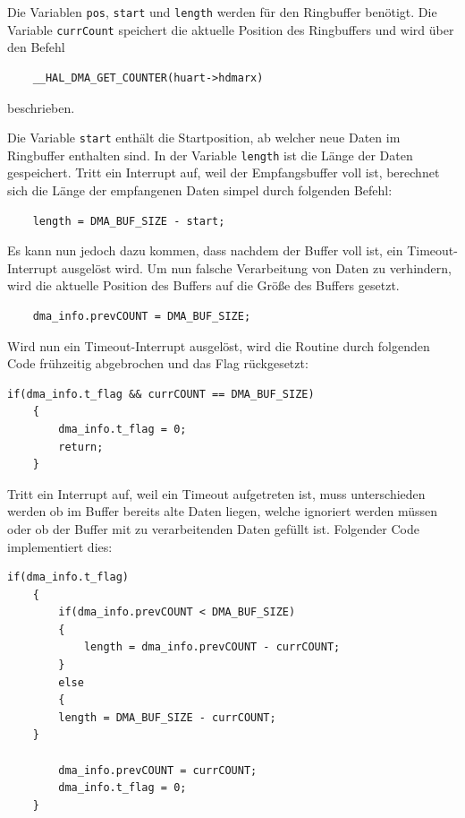   \smallskip

  Die Variablen \lstinline!pos!, \lstinline!start! und \lstinline!length! werden für den Ringbuffer benötigt. Die Variable \lstinline!currCount! speichert die aktuelle Position des
  Ringbuffers und wird über den Befehl
  
  \begin{lstlisting}
    __HAL_DMA_GET_COUNTER(huart->hdmarx)
  \end{lstlisting}
  beschrieben.

  \newpage

  Die Variable \lstinline!start! enthält die Startposition, ab welcher neue Daten im Ringbuffer enthalten sind. In der Variable \lstinline!length!
  ist die Länge der Daten gespeichert. Tritt ein Interrupt auf, weil der Empfangsbuffer voll ist, berechnet sich die Länge der empfangenen 
  Daten simpel durch folgenden Befehl:
  \begin{lstlisting}
    length = DMA_BUF_SIZE - start;
  \end{lstlisting}
  Es kann nun jedoch dazu kommen, dass nachdem der Buffer voll ist, ein Timeout-Interrupt ausgelöst wird. Um nun falsche Verarbeitung von 
  Daten zu verhindern, wird die aktuelle Position des Buffers auf die Größe des Buffers gesetzt.
  \begin{lstlisting}
    dma_info.prevCOUNT = DMA_BUF_SIZE;      
  \end{lstlisting}

  
  Wird nun ein Timeout-Interrupt ausgelöst, wird die Routine durch folgenden Code frühzeitig abgebrochen und das Flag rückgesetzt:
  \begin{lstlisting}[caption={\textit{Abbruch Timeoutinterrupt}}]
    if(dma_info.t_flag && currCOUNT == DMA_BUF_SIZE)
    {
        dma_info.t_flag = 0;
        return;
    }
  \end{lstlisting}

  \smallskip

  Tritt ein Interrupt auf, weil ein Timeout aufgetreten ist, muss unterschieden werden ob im Buffer bereits alte Daten liegen, welche ignoriert
  werden müssen oder ob der Buffer mit zu verarbeitenden Daten gefüllt ist. Folgender Code implementiert dies:

  \begin{lstlisting}[caption={\textit{Längenberechnung Timeout}}]
    if(dma_info.t_flag)
    {
    	if(dma_info.prevCOUNT < DMA_BUF_SIZE)
    	{
    		length = dma_info.prevCOUNT - currCOUNT;
    	}
    	else
    	{
  		length = DMA_BUF_SIZE - currCOUNT;
  	}

        dma_info.prevCOUNT = currCOUNT;
        dma_info.t_flag = 0;
    }
  \end{lstlisting}

